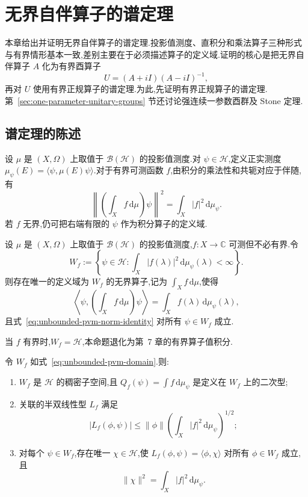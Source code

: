 \chapter{无界自伴算子的谱定理}
\label{chap:unbounded-spectral-theorem}

本章给出并证明无界自伴算子的谱定理.投影值测度、直积分和乘法算子三种形式与有界情形基本一致,差别主要在于必须描述算子的定义域.证明的核心是把无界自伴算子 \(A\) 化为有界酉算子
\[
U=(A+iI)(A-iI)^{-1},
\]
再对 \(U\) 使用有界正规算子的谱定理.为此,先证明有界正规算子的谱定理.第~\ref{sec:one-parameter-unitary-groups} 节还讨论强连续一参数酉群及 Stone 定理.

\section{谱定理的陈述}
\label{sec:unbounded-spectral-statements}

设 \(\mu\) 是 \((X,\Omega)\) 上取值于 \(\mathcal{B}(\mathcal{H})\) 的投影值测度.对 \(\psi\in\mathcal{H}\),定义正实测度 \(\mu_{\psi}(E)=\langle\psi,\mu(E)\psi\rangle\).对于有界可测函数 \(f\),由积分的乘法性和共轭对应于伴随,有
\[
\left\|\left(\int_{X}f\,\mathrm{d}\mu\right)\psi\right\|^{2}
=\int_{X}|f|^{2}\,\mathrm{d}\mu_{\psi}.
\label{eq:unbounded-pvm-norm-identity}
\]
若 \(f\) 无界,仍可把右端有限的 \(\psi\) 作为积分算子的定义域.

\begin{proposition}[无界投影值积分]\label{prop:unbounded-pvm-integral}
设 \(\mu\) 是 \((X,\Omega)\) 上取值于 \(\mathcal{B}(\mathcal{H})\) 的投影值测度,\(f:X\to\mathbb{C}\) 可测但不必有界.令
\[
W_{f}:=\left\{\psi\in\mathcal{H}:\int_{X}|f(\lambda)|^{2}\,\mathrm{d}\mu_{\psi}(\lambda)<\infty\right\}.
\label{eq:unbounded-pvm-domain}
\]
则存在唯一的定义域为 \(W_{f}\) 的无界算子,记为 \(\int_{X}f\,\mathrm{d}\mu\),使得
\[
\left\langle\psi,\left(\int_{X}f\,\mathrm{d}\mu\right)\psi\right\rangle
=\int_{X}f(\lambda)\,\mathrm{d}\mu_{\psi}(\lambda),
\]
且式~\eqref{eq:unbounded-pvm-norm-identity} 对所有 \(\psi\in W_{f}\) 成立.
\end{proposition}

当 \(f\) 有界时,\(W_{f}=\mathcal{H}\),本命题退化为第~7 章的有界算子值积分.

\begin{proposition}[无界积分的二次型性质]\label{prop:unbounded-integral-quadratic}
令 \(W_{f}\) 如式~\eqref{eq:unbounded-pvm-domain}.则:
\begin{enumerate}
\item \(W_{f}\) 是 \(\mathcal{H}\) 的稠密子空间,且 \(Q_{f}(\psi)=\int f\,\mathrm{d}\mu_{\psi}\) 是定义在 \(W_{f}\) 上的二次型;
\item 关联的半双线性型 \(L_{f}\) 满足
\[
|L_{f}(\phi,\psi)|\leq\|\phi\|\left(\int_{X}|f|^{2}\,\mathrm{d}\mu_{\psi}\right)^{1/2};
\label{eq:unbounded-integral-form-bound}
\]
\item 对每个 \(\psi\in W_{f}\),存在唯一 \(\chi\in\mathcal{H}\),使 \(L_{f}(\phi,\psi)=\langle\phi,\chi\rangle\) 对所有 \(\phi\in W_{f}\) 成立,且
\[
\|\chi\|^{2}=\int_{X}|f|^{2}\,\mathrm{d}\mu_{\psi}.
\]
\end{enumerate}
\end{proposition}

